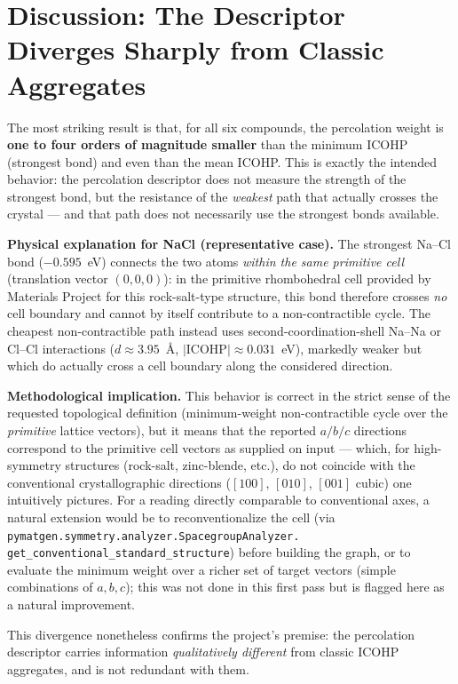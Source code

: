 \documentclass[11pt,a4paper]{article}
\begin{document}
\section{Discussion: The Descriptor Diverges Sharply from Classic Aggregates}

The most striking result is that, for all six compounds, the percolation
weight is \textbf{one to four orders of magnitude smaller} than the
minimum ICOHP (strongest bond) and even than the mean ICOHP. This is
exactly the intended behavior: the percolation descriptor does not measure
the strength of the strongest bond, but the resistance of the
\emph{weakest} path that actually crosses the crystal --- and that path
does not necessarily use the strongest bonds available.

\textbf{Physical explanation for NaCl (representative case).} The
strongest Na--Cl bond ($-0.595$~eV) connects the two atoms \emph{within
the same primitive cell} (translation vector $(0,0,0)$): in the primitive
rhombohedral cell provided by Materials Project for this rock-salt-type
structure, this bond therefore crosses \emph{no} cell boundary and cannot
by itself contribute to a non-contractible cycle. The cheapest
non-contractible path instead uses second-coordination-shell Na--Na or
Cl--Cl interactions ($d \approx 3.95$~\AA, $|\text{ICOHP}| \approx
0.031$~eV), markedly weaker but which do actually cross a cell boundary
along the considered direction.

\textbf{Methodological implication.} This behavior is correct in the
strict sense of the requested topological definition (minimum-weight
non-contractible cycle over the \emph{primitive} lattice vectors), but it
means that the reported $a/b/c$ directions correspond to the primitive
cell vectors as supplied on input --- which, for high-symmetry structures
(rock-salt, zinc-blende, etc.), do not coincide with the conventional
crystallographic directions ($[100]$, $[010]$, $[001]$ cubic) one
intuitively pictures. For a reading directly comparable to conventional
axes, a natural extension would be to reconventionalize the cell (via
\texttt{pymatgen.symmetry.analyzer.SpacegroupAnalyzer.
get\_conventional\_standard\_structure}) before building the graph, or to
evaluate the minimum weight over a richer set of target vectors (simple
combinations of $a,b,c$); this was not done in this first pass but is
flagged here as a natural improvement.

This divergence nonetheless confirms the project's premise: the
percolation descriptor carries information \emph{qualitatively different}
from classic ICOHP aggregates, and is not redundant with them.
\end{document}
